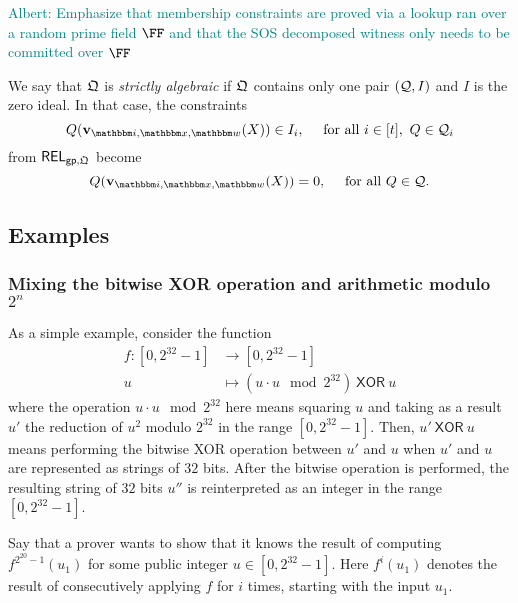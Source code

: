 \documentclass[11pt,letterpaper,usenames,dvipsnames]{article}
\newcommand{\albert}[1]{\textcolor{teal}{Albert: {#1}}}
\begin{document}
    \begin{remark}
        \albert{Emphasize that membership constraints are proved via a lookup ran over a random prime field $\FF$ and that the SOS decomposed witness only needs to be committed over $\FF$}
    \end{remark}

    \begin{definition}\label{d: strictly_algebraic} We say that  $\mathfrak{Q}$ is \emph{strictly algebraic} if $\mathfrak{Q}$ contains only one pair $(\mathcal{Q}, I)$ and $I$ is the zero ideal.  In that case,  the constraints $$Q(\vv_{\idx, \inp,\wit}(X))\in I_i, \quad \text{ for all } i\in [t],\ Q\in \cQ_i$$ from $\mathsf{REL}_{\mathsf{gp},\mathfrak{Q}}$ become $$Q(\vv_{\idx, \inp,\wit}(X))=0, \quad  \text{ for all }Q\in \cQ.$$
    \end{definition}
    
\subsection{Examples}\label{s: example_sha}

\subsubsection{Mixing the bitwise XOR operation and arithmetic modulo $2^n$}

\newcommand{\and}{\ \mathsf{AND}\ }
\newcommand{\xor}{\ \mathsf{XOR}\ }
\newcommand{\eq}{\mathsf{eq}}

As a simple example, consider the function 
%
\begin{align*}
f: [0, 2^{32}-1] &\to [0, 2^{32}-1]\\
u &\mapsto (u\cdot u \mod 2^{32}) \xor u
\end{align*}
%
where the operation $u\cdot u \mod 2^{32}$ here means squaring $u$ and taking as a result $u'$ the reduction of $u^2$ modulo $2^{32}$ in the range $[0,2^{32}-1]$. Then,  $u'\xor u$ means performing the bitwise XOR operation between $u'$ and $u$ when $u'$ and $u$ are represented as strings of $32$ bits. After the bitwise operation is performed, the resulting string of $32$ bits $u''$ is reinterpreted as an integer in the range $[0, 2^{32}-1]$. 

Say that a prover wants to show that it knows the result of computing $f^{2^{20}-1}(u_1)$ for some public integer $u\in [0, 2^{32}-1]$. Here $f^{i}(u_1)$ denotes the result of consecutively applying $f$ for $i$ times, starting with the input $u_1$. 
\end{document}
